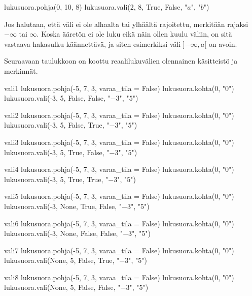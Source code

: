 \begin{kuva}
lukusuora.pohja(0, 10, 8)
lukusuora.vali(2, 8, True, False, "$a$", "$b$")
\end{kuva}

Jos halutaan, että väli ei ole alhaalta tai ylhäältä rajoitettu, merkitään rajaksi $-\infty$ tai $\infty$. Koska ääretön ei ole luku eikä näin ollen kuulu väliin, on sitä vastaava hakasulku käännettävä, ja siten esimerkiksi väli $]{-\infty}, a[$ on avoin. 

Seuraavaan taulukkoon on koottu reaalilukuvälien olennainen käsitteistö ja merkinnät.

\begin{luoKuva}{vali1}
lukusuora.pohja(-5, 7, 3, varaa_tila = False)
lukusuora.kohta(0, "$0$")
lukusuora.vali(-3, 5, False, False, "$-3$", "$5$")
\end{luoKuva}
\begin{luoKuva}{vali2}
lukusuora.pohja(-5, 7, 3, varaa_tila = False)
lukusuora.kohta(0, "$0$")
lukusuora.vali(-3, 5, False, True, "$-3$", "$5$")
\end{luoKuva}
\begin{luoKuva}{vali3}
lukusuora.pohja(-5, 7, 3, varaa_tila = False)
lukusuora.kohta(0, "$0$")
lukusuora.vali(-3, 5, True, False, "$-3$", "$5$")
\end{luoKuva}
\begin{luoKuva}{vali4}
lukusuora.pohja(-5, 7, 3, varaa_tila = False)
lukusuora.kohta(0, "$0$")
lukusuora.vali(-3, 5, True, True, "$-3$", "$5$")
\end{luoKuva}
\begin{luoKuva}{vali5}
lukusuora.pohja(-5, 7, 3, varaa_tila = False)
lukusuora.kohta(0, "$0$")
lukusuora.vali(-3, None, True, False, "$-3$", "$5$")
\end{luoKuva}
\begin{luoKuva}{vali6}
lukusuora.pohja(-5, 7, 3, varaa_tila = False)
lukusuora.kohta(0, "$0$")
lukusuora.vali(-3, None, False, False, "$-3$", "$5$")
\end{luoKuva}
\begin{luoKuva}{vali7}
lukusuora.pohja(-5, 7, 3, varaa_tila = False)
lukusuora.kohta(0, "$0$")
lukusuora.vali(None, 5, False, True, "$-3$", "$5$")
\end{luoKuva}
\begin{luoKuva}{vali8}
lukusuora.pohja(-5, 7, 3, varaa_tila = False)
lukusuora.kohta(0, "$0$")
lukusuora.vali(None, 5, False, False, "$-3$", "$5$")
\end{luoKuva}

